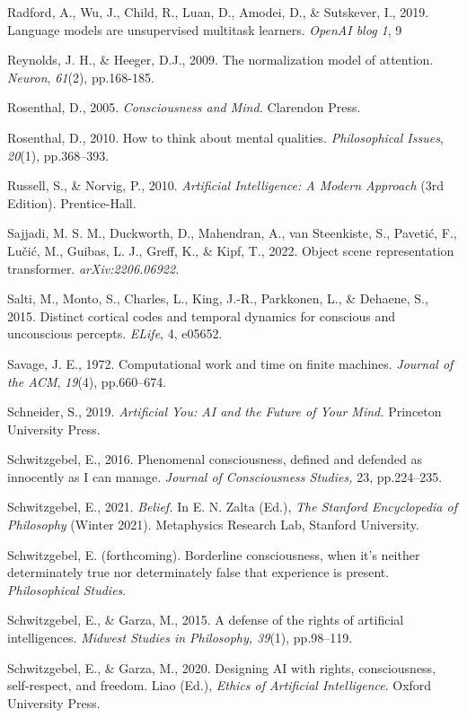 \documentclass[12pt]{article}
\begin{document}
Radford, A., Wu, J., Child, R., Luan, D., Amodei, D., \& Sutskever, I.,
2019. Language models are unsupervised multitask learners. \emph{OpenAI
blog 1}, 9

Reynolds, J. H., \& Heeger, D.J., 2009. The normalization model of
attention. \emph{Neuron}, \emph{61}(2), pp.168-185.

Rosenthal, D., 2005. \emph{Consciousness and Mind.} Clarendon Press.

Rosenthal, D., 2010. How to think about mental qualities.
\emph{Philosophical Issues}, \emph{20}(1), pp.368--393.

Russell, S., \& Norvig, P., 2010. \emph{Artificial Intelligence: A
Modern Approach} (3rd Edition). Prentice-Hall.

Sajjadi, M. S. M., Duckworth, D., Mahendran, A., van Steenkiste, S.,
Pavetić, F., Lučić, M., Guibas, L. J., Greff, K., \& Kipf, T., 2022.
Object scene representation transformer. \emph{arXiv:2206.06922.}

Salti, M., Monto, S., Charles, L., King, J.-R., Parkkonen, L., \&
Dehaene, S., 2015. Distinct cortical codes and temporal dynamics for
conscious and unconscious percepts. \emph{ELife}, 4, e05652.

Savage, J. E., 1972. Computational work and time on finite machines.
\emph{Journal of the ACM}, \emph{19}(4), pp.660--674.

Schneider, S., 2019. \emph{Artificial You: AI and the Future of Your
Mind.} Princeton University Press.

Schwitzgebel, E., 2016. Phenomenal consciousness, defined and defended
as innocently as I can manage. \emph{Journal of Consciousness Studies,}
23, pp.224--235.

Schwitzgebel, E., 2021. \emph{Belief.} In E. N. Zalta (Ed.), \emph{The
Stanford Encyclopedia of Philosophy} (Winter 2021). Metaphysics Research
Lab, Stanford University.

Schwitzgebel, E. (forthcoming). Borderline consciousness, when it's
neither determinately true nor determinately false that experience is
present. \emph{Philosophical Studies}.

Schwitzgebel, E., \& Garza, M., 2015. A defense of the rights of
artificial intelligences. \emph{Midwest Studies in Philosophy, 39}(1),
pp.98--119.

Schwitzgebel, E., \& Garza, M., 2020. Designing AI with rights,
consciousness, self-respect, and freedom. Liao (Ed.), \emph{Ethics of
Artificial Intelligence}. Oxford University Press.
\end{document}
